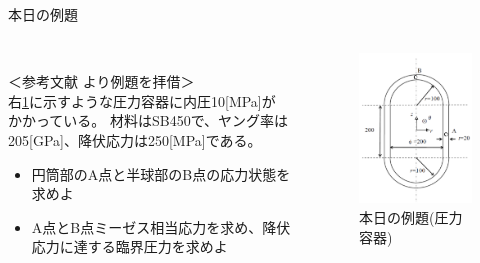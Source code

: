 \begin{frame}{本日の例題}
 
    \begin{columns}[t]
    \begin{column}{0.65\textwidth}
        \\
        ＜参考文献\cite{wanted} より例題を拝借＞ \\
	    右\figurename \ref{fig:example-probrem}に示すような圧力容器に内圧10[\si{\mega\pascal}]が \\
        かかっている。
        材料はSB450で、ヤング率は205[\si{\giga\pascal}]、降伏応力は250[\si{\mega\pascal}]である。 \\
         \Add{[後述]}
        \begin{itemize}
          \item[①]{円筒部のA点と半球部のB点の応力状態を求めよ}
          \item[②]{A点とB点ミーゼス相当応力を求め、降伏応力に達する臨界圧力を求めよ}
        \end{itemize}
    \end{column}
    \begin{column}{0.35\textwidth}
      \begin{figure}[htbp]
        \begin{center}
          \includegraphics[keepaspectratio,scale=2.2]{images/example-probrem.png}
            \caption{本日の例題(圧力容器)} \label{fig:example-probrem}
        \end{center}
      \end{figure}
    \end{column}
  \end{columns}
\end{frame}
